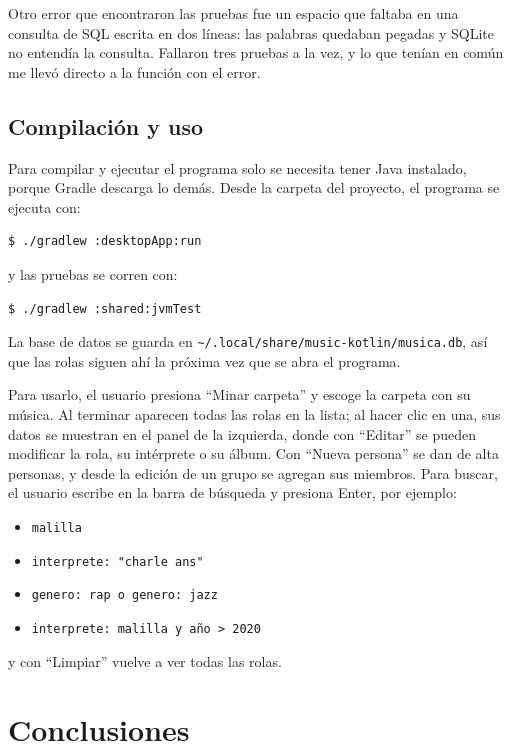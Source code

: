 \documentclass[12pt,letterpaper]{article}
\begin{document}
Otro error que encontraron las pruebas fue un espacio que faltaba en una
consulta de SQL escrita en dos líneas: las palabras quedaban pegadas y
SQLite no entendía la consulta. Fallaron tres pruebas a la vez, y lo que
tenían en común me llevó directo a la función con el error.

\subsection{Compilación y uso}

Para compilar y ejecutar el programa solo se necesita tener Java
instalado, porque Gradle descarga lo demás. Desde la carpeta del
proyecto, el programa se ejecuta con:

\begin{verbatim}
$ ./gradlew :desktopApp:run
\end{verbatim}

y las pruebas se corren con:

\begin{verbatim}
$ ./gradlew :shared:jvmTest
\end{verbatim}

La base de datos se guarda en
\texttt{\textasciitilde/.local/share/music-kotlin/musica.db}, así que las
rolas siguen ahí la próxima vez que se abra el programa.

Para usarlo, el usuario presiona ``Minar carpeta'' y escoge la carpeta con
su música. Al terminar aparecen todas las rolas en la lista; al hacer clic
en una, sus datos se muestran en el panel de la izquierda, donde con
``Editar'' se pueden modificar la rola, su intérprete o su álbum. Con
``Nueva persona'' se dan de alta personas, y desde la edición de un grupo
se agregan sus miembros. Para buscar, el usuario escribe en la barra de
búsqueda y presiona Enter, por ejemplo:

\begin{itemize}
    \item \texttt{malilla}
    \item \texttt{interprete: "charle ans"}
    \item \texttt{genero: rap o genero: jazz}
    \item \texttt{interprete: malilla y año > 2020}
\end{itemize}

y con ``Limpiar'' vuelve a ver todas las rolas.

\section{Conclusiones}
\end{document}
